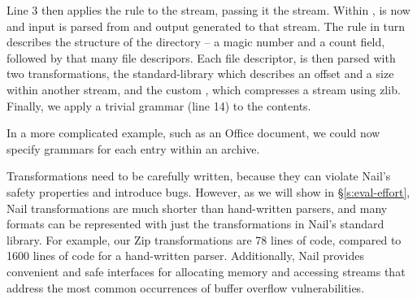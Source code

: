 Line 3 then applies the  rule to  the  stream, passing it the 
stream. Within ,  is now  and input is parsed from and output
generated to that stream. The  rule in turn describes the structure of the directory -- a
magic number and a count field, followed by that many file descripors. Each file descriptor, is then parsed with two
transformations, the standard-library  which describes an offset and a size within another
stream, and the custom , which compresses a stream using zlib. Finally, we apply a trivial
grammar (line 14) to the contents. 

In a more complicated example, such as an Office document, we could now specify grammars for each
entry within an archive.


 

Transformations need to be carefully written, because they can violate Nail's safety properties
and introduce
bugs. However, as we will show in \S\ref{s:eval-effort}, Nail transformations are much shorter than
hand-written parsers, and many formats can be represented with just the transformations in Nail's
standard library.
For example, our Zip transformations are 78 lines of code, compared to 1600 lines of code for a
   hand-written parser. Additionally, Nail provides convenient and safe interfaces for allocating
   memory and accessing streams that address the most common occurrences of buffer overflow
   vulnerabilities.  


